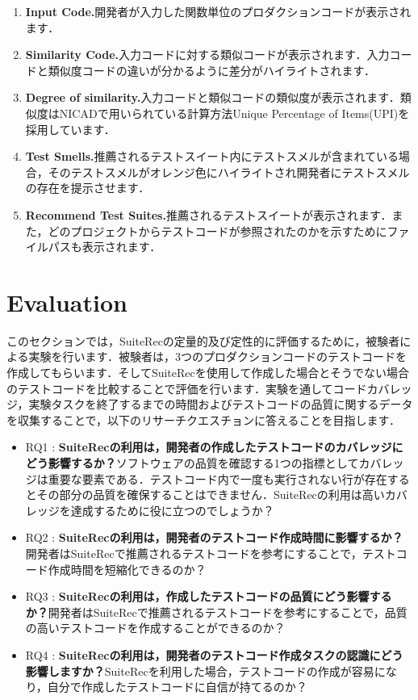 \documentclass[conference]{IEEEtran}
\begin{document}
 \begin{enumerate}
\renewcommand{\labelenumi}{\textcircled{\scriptsize \theenumi}}
\item{\textbf{Input Code.}開発者が入力した関数単位のプロダクションコードが表示されます．}
\item{\textbf{Similarity Code.}入力コードに対する類似コードが表示されます．入力コードと類似度コードの違いが分かるように差分がハイライトされます．}
\item{\textbf{Degree of similarity.}入力コードと類似コードの類似度が表示されます．類似度はNICADで用いられている計算方法Unique Percentage of Items(UPI)を採用しています．}
\item{\textbf{Test Smells.}推薦されるテストスイート内にテストスメルが含まれている場合，そのテストスメルがオレンジ色にハイライトされ開発者にテストスメルの存在を提示させます．}
\item{\textbf{Recommend Test Suites.}推薦されるテストスイートが表示されます．また，どのプロジェクトからテストコードが参照されたのかを示すためにファイルパスも表示されます．}
\end{enumerate}


\section{Evaluation}

このセクションでは，SuiteRecの定量的及び定性的に評価するために，被験者による実験を行います．被験者は，3つのプロダクションコードのテストコードを作成してもらいます．そしてSuiteRecを使用して作成した場合とそうでない場合のテストコードを比較することで評価を行います．実験を通してコードカバレッジ，実験タスクを終了するまでの時間およびテストコードの品質に関するデータを収集することで，以下のリサーチクエスチョンに答えることを目指します．

\begin{itemize}
\item RQ1 : \textbf{SuiteRecの利用は，開発者の作成したテストコードのカバレッジにどう影響するか？}ソフトウェアの品質を確認する1つの指標としてカバレッジは重要な要素である．テストコード内で一度も実行されない行が存在するとその部分の品質を確保することはできません．SuiteRecの利用は高いカバレッジを達成するために役に立つのでしょうか？
\item RQ2 : \textbf{SuiteRecの利用は，開発者のテストコード作成時間に影響するか？}開発者はSuiteRecで推薦されるテストコードを参考にすることで，テストコード作成時間を短縮化できるのか？
\item RQ3 : \textbf{SuiteRecの利用は，作成したテストコードの品質にどう影響するか？}開発者はSuiteRecで推薦されるテストコードを参考にすることで，品質の高いテストコードを作成することができるのか？
\item RQ4 : \textbf{SuiteRecの利用は，開発者のテストコード作成タスクの認識にどう影響しますか？}SuiteRecを利用した場合，テストコードの作成が容易になり，自分で作成したテストコードに自信が持てるのか？
\end{itemize}
\end{document}

